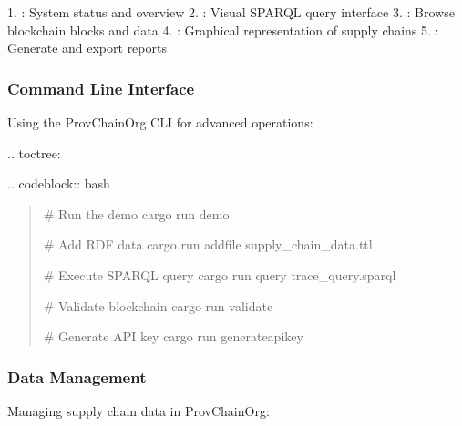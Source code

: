 \documentclass[letterpaper,10pt,english]{sphinxmanual}
\begin{document}
\sphinxAtStartPar
{}
1. : System status and overview
2. : Visual SPARQL query interface
3. : Browse blockchain blocks and data
4. : Graphical representation of supply chains
5. : Generate and export reports


\subsubsection{Command Line Interface}
\label{\detokenize{user-guide/index:command-line-interface}}
\sphinxAtStartPar
Using the ProvChainOrg CLI for advanced operations:

\sphinxAtStartPar
{}
.. toctree:

\begin{sphinxVerbatim}[commandchars=\\\{\}]
 
   

\end{sphinxVerbatim}

\sphinxAtStartPar
{}
.. code\sphinxhyphen{}block:: bash
\begin{quote}

\sphinxAtStartPar
\# Run the demo
cargo run demo

\sphinxAtStartPar
\# Add RDF data
cargo run \textendash{} add\sphinxhyphen{}file supply\_chain\_data.ttl

\sphinxAtStartPar
\# Execute SPARQL query
cargo run \textendash{} query trace\_query.sparql

\sphinxAtStartPar
\# Validate blockchain
cargo run \textendash{} validate

\sphinxAtStartPar
\# Generate API key
cargo run \textendash{} generate\sphinxhyphen{}api\sphinxhyphen{}key
\end{quote}


\subsubsection{Data Management}
\label{\detokenize{user-guide/index:data-management}}
\sphinxAtStartPar
Managing supply chain data in ProvChainOrg:
\end{document}
